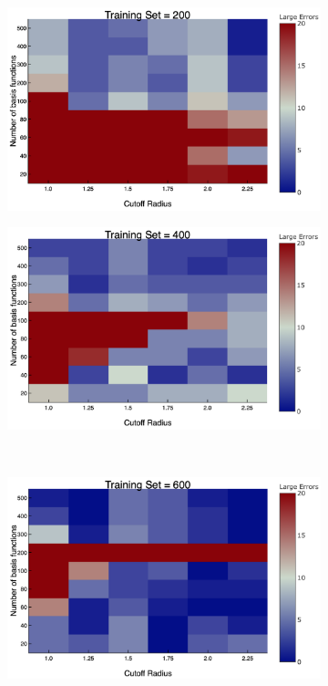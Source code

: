 \begin{figure}
  \begin{subfigure}{0.5\textwidth}
    \includegraphics[width=\linewidth]{Figures/numErrors2}
    \caption{} 
    \label{numErrors2}
  \end{subfigure}%
  \hspace*{\fill}   %
  \begin{subfigure}{0.5\textwidth}
    \includegraphics[width=\linewidth]{Figures/numErrors4}
    \caption{} 
    \label{numErrors4}
  \end{subfigure}%
    \\
  \begin{subfigure}{0.5\textwidth}
    \includegraphics[width=\linewidth]{Figures/numErrors6}

\end{subfigure}
\end{figure}
